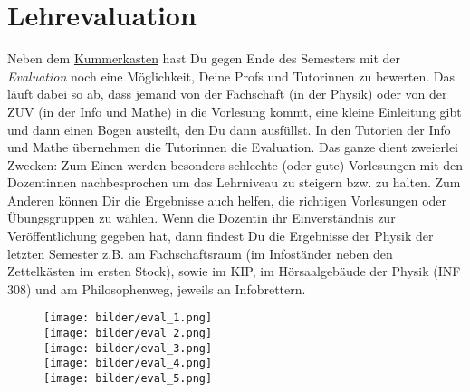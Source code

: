 \section{Lehrevaluation}
\label{eval}



\noindent Neben dem \hyperref[kummerkasten]{Kummerkasten} hast Du gegen Ende des Semesters mit der \emph{Evaluation} noch eine Möglichkeit, Deine Profs und Tutorinnen zu bewerten. Das läuft dabei so ab, dass jemand von der Fachschaft (in der Physik) oder von der ZUV (in der Info und Mathe) in die Vorlesung kommt, eine kleine Einleitung gibt und dann einen Bogen austeilt, den Du dann ausfüllst. In den Tutorien der Info und Mathe übernehmen die Tutorinnen die Evaluation. Das ganze dient zweierlei Zwecken: Zum Einen werden besonders schlechte (oder gute) Vorlesungen mit den Dozentinnen nachbesprochen um das Lehrniveau zu steigern bzw. zu halten. Zum Anderen können Dir die Ergebnisse auch helfen, die richtigen Vorlesungen oder Übungsgruppen zu wählen. Wenn die Dozentin ihr Einverständnis zur Veröffentlichung gegeben hat, dann findest Du die Ergebnisse der Physik der letzten Semester z.B. am Fachschaftsraum (im Infoständer neben den Zettelkästen im ersten Stock), sowie im \gls{KIP}, im Hörsaalgebäude der Physik (\Gls{INF} 308) und am Philosophenweg, jeweils an Infobrettern.

\vfill
\eject

\begin{figure}[h]
\centering
        \texttt{[image: bilder/eval\_1.png]}\\
        \texttt{[image: bilder/eval\_2.png]}\\
        \texttt{[image: bilder/eval\_3.png]}\\
        \texttt{[image: bilder/eval\_4.png]}\\
        \texttt{[image: bilder/eval\_5.png]}\\
\end{figure}

\vfill